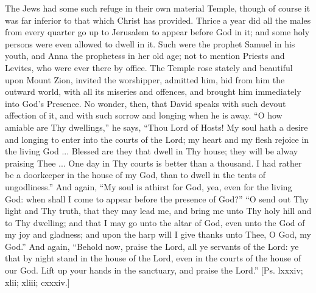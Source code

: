The Jews had some such refuge in their own material Temple, though
of course it was far inferior to that which Christ has provided.
Thrice a year did all the males from every quarter go up to Jerusalem
to appear before God in it; and some holy persons were even allowed to
dwell in it. Such were the prophet Samuel in his youth, and Anna the
prophetess in her old age; not to mention Priests and Levites, who
were ever there by office. The Temple rose stately and beautiful upon
Mount Zion, invited the worshipper, admitted him, hid from him the
outward world, with all its miseries and offences, and brought him
immediately into God's Presence. No wonder, then, that David speaks
with such devout affection of it, and with such sorrow and longing
when he is away. ``O how amiable are Thy dwellings,'' he says,
``Thou Lord of Hosts! My soul hath a desire and longing to enter
into the courts of the Lord; my heart and my flesh rejoice in the
living God ... Blessed are they that dwell in Thy house; they will be
alway praising Thee ... One day in Thy courts is better than a
thousand. I had rather be a doorkeeper in the house of my God, than to
dwell in the tents of ungodliness.'' And again, ``My soul is
athirst for God, yea, even for the living God: when shall I come to
appear before the presence of God?'' ``O send out Thy light
and Thy truth, that they may lead me, and bring me unto Thy holy hill
and to Thy dwelling; and that I may go unto the altar of God, even
unto the God of my joy and gladness; and upon the harp will I give
thanks unto Thee, O God, my God.'' And again, ``Behold now,
praise the Lord, all ye servants of the Lord: ye that by night stand
in the house of the Lord, even in the courts of the house of our God.
Lift up your hands in the sanctuary, and praise the Lord.'' [Ps.
lxxxiv; xlii; xliii; cxxxiv.]

